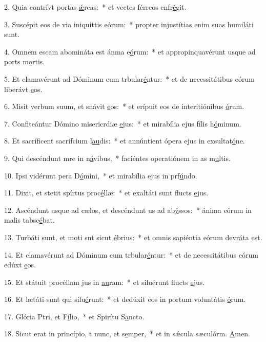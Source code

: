 2. Quia contrívt portas \uline{ǽ}reas:~* et vectes férreos cnfr\uline{é}git.\par 
3. Suscépit eos de via iniquittis e\uline{ó}rum:~* propter injustítias enim suas humil\uline{á}ti sunt.\par 
4. Omnem escam abomináta est ánma e\uline{ó}rum:~* et appropinquavérunt usque ad ports m\uline{o}rtis.\par 
5. Et clamavérunt ad Dóminum cum trbular\uline{é}ntur:~* et de necessitátibus eórum liberávt \uline{e}os.\par 
6. Misit verbum suum, et snávit \uline{e}os:~* et erípuit eos de interitiónibus \uline{ó}rum.\par 
7. Confiteántur Dómino misericrdiæ \uline{e}jus:~* et mirabília ejus fílis h\uline{ó}minum.\par 
8. Et sacríficent sacrifcium l\uline{au}dis:~* et annúntient ópera ejus in exsultat\uline{ó}ne.\par 
9. Qui descéndunt mre in n\uline{á}vibus,~* faciéntes operatiónem in as m\uline{u}ltis.\par 
10. Ipsi vidérunt pera D\uline{ó}mini,~* et mirabília ejus in prf\uline{ú}ndo.\par 
11. Dixit, et stetit spírtus proc\uline{é}llæ:~* et exaltáti sunt flucts \uline{e}jus.\par 
12. Ascéndunt usque ad cælos, et descéndunt us ad ab\uline{ý}ssos:~* ánima eórum in malis tabsc\uline{é}bat.\par 
13. Turbáti sunt, et moti snt sicut \uline{é}brius:~* et omnis sapiéntia eórum devr\uline{á}ta est.\par 
14. Et clamavérunt ad Dóminum cum trbular\uline{é}ntur:~* et de necessitátibus eórum edúxt \uline{e}os.\par 
15. Et státuit procéllam jus in \uline{au}ram:~* et siluérunt flucts \uline{e}jus.\par 
16. Et lætáti sunt qui silu\uline{é}runt:~* et dedúxit eos in portum voluntátis \uline{ó}rum.\par 
17. Glória Ptri, et F\uline{í}lio,~* et Spirítu S\uline{a}ncto.\par 
18. Sicut erat in princípio, t nunc, et s\uline{e}mper,~* et in sǽcula sæculórm. \uline{A}men.\par 
